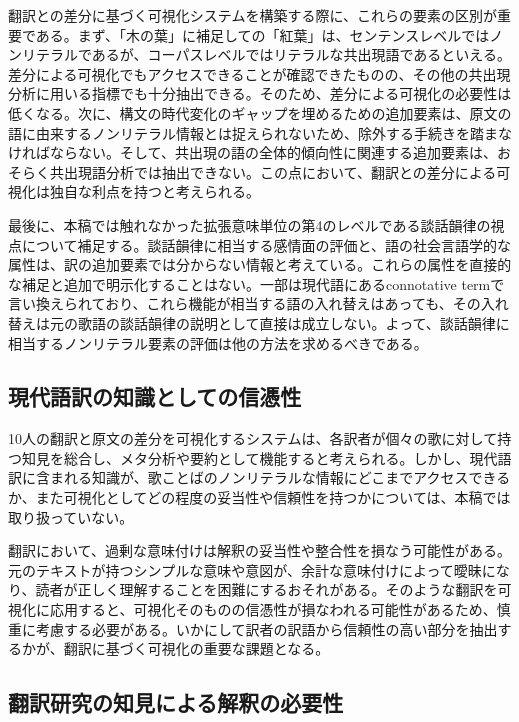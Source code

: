 \documentclass[
  letterpaper,
  DIV=11,
  numbers=noendperiod]{scrartcl}
\begin{document}
翻訳との差分に基づく可視化システムを構築する際に、これらの要素の区別が重要である。まず、「木の葉」に補足しての「紅葉」は、センテンスレベルではノンリテラルであるが、コーパスレベルではリテラルな共出現語であるといえる。差分による可視化でもアクセスできることが確認できたものの、その他の共出現分析に用いる指標でも十分抽出できる。そのため、差分による可視化の必要性は低くなる。次に、構文の時代変化のギャップを埋めるための追加要素は、原文の語に由来するノンリテラル情報とは捉えられないため、除外する手続きを踏まなければならない。そして、共出現の語の全体的傾向性に関連する追加要素は、おそらく共出現語分析では抽出できない。この点において、翻訳との差分による可視化は独自な利点を持つと考えられる。

最後に、本稿では触れなかった拡張意味単位の第4のレベルである談話韻律の視点について補足する。談話韻律に相当する感情面の評価と、語の社会言語学的な属性は、訳の追加要素では分からない情報と考えている。これらの属性を直接的な補足と追加で明示化することはない。一部は現代語にあるconnotative
termで言い換えられており、これら機能が相当する語の入れ替えはあっても、その入れ替えは元の歌語の談話韻律の説明として直接は成立しない。よって、談話韻律に相当するノンリテラル要素の評価は他の方法を求めるべきである。

\subsection{現代語訳の知識としての信憑性}\label{ux73feux4ee3ux8a9eux8a33ux306eux77e5ux8b58ux3068ux3057ux3066ux306eux4fe1ux6191ux6027}

10人の翻訳と原文の差分を可視化するシステムは、各訳者が個々の歌に対して持つ知見を総合し、メタ分析や要約として機能すると考えられる。しかし、現代語訳に含まれる知識が、歌ことばのノンリテラルな情報にどこまでアクセスできるか、また可視化としてどの程度の妥当性や信頼性を持つかについては、本稿では取り扱っていない。

翻訳において、過剰な意味付けは解釈の妥当性や整合性を損なう可能性がある。元のテキストが持つシンプルな意味や意図が、余計な意味付けによって曖昧になり、読者が正しく理解することを困難にするおそれがある。そのような翻訳を可視化に応用すると、可視化そのものの信憑性が損なわれる可能性があるため、慎重に考慮する必要がある。いかにして訳者の訳語から信頼性の高い部分を抽出するかが、翻訳に基づく可視化の重要な課題となる。

\subsection{翻訳研究の知見による解釈の必要性}\label{ux7ffbux8a33ux7814ux7a76ux306eux77e5ux898bux306bux3088ux308bux89e3ux91c8ux306eux5fc5ux8981ux6027}
\end{document}
